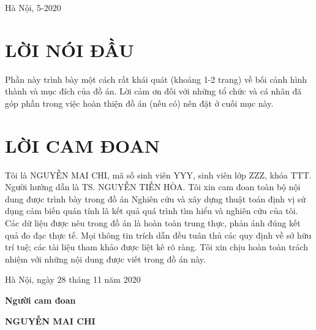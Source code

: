 \documentclass{article} %
\begin{document}
\begin{titlepage}
\begin{center}
\vspace{4.5cm}

\fontsize{14pt}{0pt}\selectfont Hà Nội, 5-2020    
\end{center}
\end{titlepage}
\cleardoublepage
\section*{\centering LỜI NÓI ĐẦU}
\thispagestyle{empty}
Phần này trình bày một cách rất khái quát (khoảng 1-2 trang) về bối cảnh hình thành và mục đích của đồ án. Lời cảm ơn đối với những tổ chức và cá nhân đã góp phần trong việc hoàn thiện đồ án (nếu có) nên đặt ở cuối mục này.
\cleardoublepage

\section*{\centering LỜI CAM ĐOAN}
\thispagestyle{empty}
Tôi là NGUYỄN MAI CHI, mã số sinh viên YYY, sinh viên lớp ZZZ, khóa TTT. Người hướng dẫn là TS. NGUYỄN TIẾN HÒA. Tôi xin cam đoan toàn bộ nội dung được trình bày trong đồ án Nghiên cứu và xây dựng thuật toán định vị sử dụng cảm biến quán tính là kết quả quá trình tìm hiểu và nghiên cứu của tôi. Các dữ liệu được nêu trong đồ án là hoàn toàn trung thực, phản ánh đúng kết quả đo đạc thực tế. Mọi thông tin trích dẫn đều tuân thủ các quy định về sở hữu trí tuệ; các tài liệu tham khảo được liệt kê rõ ràng. Tôi xin chịu hoàn toàn trách nhiệm với những nội dung được viết trong đồ án này.

\vspace{6pt}
\hspace{7cm}Hà Nội, ngày 28 tháng 11 năm 2020

\hspace{9cm}\textbf{Người cam đoan}

\vspace{2cm}
\hspace{8.65cm}\textbf{NGUYỄN MAI CHI}
\cleardoublepage

\tableofcontents 
\thispagestyle{empty}
\cleardoublepage

\end{document}
